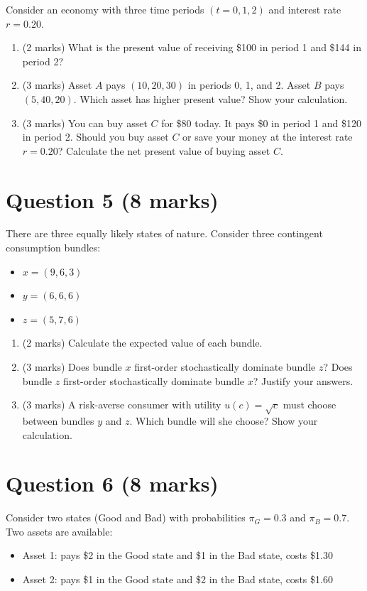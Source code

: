 \documentclass[12pt]{article}
\begin{document}
Consider an economy with three time periods $(t = 0, 1, 2)$ and interest rate $r = 0.20$.

\begin{enumerate}[label=(\alph*)]
\item (2 marks) What is the present value of receiving \$100 in period 1 and \$144 in period 2?
\item (3 marks) Asset $A$ pays $(10, 20, 30)$ in periods 0, 1, and 2. Asset $B$ pays $(5, 40, 20)$. Which asset has higher present value? Show your calculation.
\item (3 marks) You can buy asset $C$ for \$80 today. It pays \$0 in period 1 and \$120 in period 2. Should you buy asset $C$ or save your money at the interest rate $r = 0.20$? Calculate the net present value of buying asset $C$.
\end{enumerate}

\bigskip

\section*{Question 5 (8 marks)}

There are three equally likely states of nature. Consider three contingent consumption bundles:
\begin{itemize}
\item $x = (9, 6, 3)$
\item $y = (6, 6, 6)$
\item $z = (5, 7, 6)$
\end{itemize}

\begin{enumerate}[label=(\alph*)]
\item (2 marks) Calculate the expected value of each bundle.
\item (3 marks) Does bundle $x$ first-order stochastically dominate bundle $z$? Does bundle $z$ first-order stochastically dominate bundle $x$? Justify your answers.
\item (3 marks) A risk-averse consumer with utility $u(c) = \sqrt{c}$ must choose between bundles $y$ and $z$. Which bundle will she choose? Show your calculation.
\end{enumerate}

\bigskip

\section*{Question 6 (8 marks)}

Consider two states (Good and Bad) with probabilities $\pi_G = 0.3$ and $\pi_B = 0.7$. Two assets are available:
\begin{itemize}
\item Asset 1: pays \$2 in the Good state and \$1 in the Bad state, costs \$1.30
\item Asset 2: pays \$1 in the Good state and \$2 in the Bad state, costs \$1.60
\end{itemize}
\end{document}
